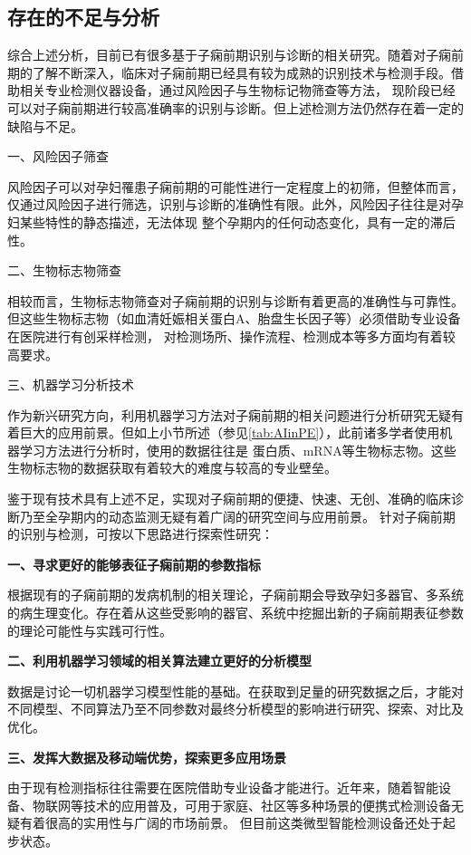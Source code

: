 \subsection{存在的不足与分析}
综合上述分析，目前已有很多基于子痫前期识别与诊断的相关研究。随着对子痫前期的了解不断深入，临床对子痫前期已经具有较为成熟的识别技术与检测手段。借助相关专业检测仪器设备，通过风险因子与生物标记物筛查等方法，
现阶段已经可以对子痫前期进行较高准确率的识别与诊断。但上述检测方法仍然存在着一定的缺陷与不足。

一、风险因子筛查

风险因子可以对孕妇罹患子痫前期的可能性进行一定程度上的初筛，但整体而言，仅通过风险因子进行筛选，识别与诊断的准确性有限。此外，风险因子往往是对孕妇某些特性的静态描述，无法体现
整个孕期内的任何动态变化，具有一定的滞后性。

二、生物标志物筛查

相较而言，生物标志物筛查对子痫前期的识别与诊断有着更高的准确性与可靠性。但这些生物标志物（如血清妊娠相关蛋白A、胎盘生长因子等）必须借助专业设备在医院进行有创采样检测，
对检测场所、操作流程、检测成本等多方面均有着较高要求。

三、机器学习分析技术

作为新兴研究方向，利用机器学习方法对子痫前期的相关问题进行分析研究无疑有着巨大的应用前景。但如上小节所述（参见\autoref{tab:AIinPE}），此前诸多学者使用机器学习方法进行分析时，使用的数据往往是
蛋白质、mRNA等生物标志物。这些生物标志物的数据获取有着较大的难度与较高的专业壁垒。

鉴于现有技术具有上述不足，实现对子痫前期的便捷、快速、无创、准确的临床诊断乃至全孕期内的动态监测无疑有着广阔的研究空间与应用前景。
针对子痫前期的识别与检测，可按以下思路进行探索性研究：

\textbf{一、寻求更好的能够表征子痫前期的参数指标}

根据现有的子痫前期的发病机制的相关理论，子痫前期会导致孕妇多器官、多系统的病生理变化。存在着从这些受影响的器官、系统中挖掘出新的子痫前期表征参数的理论可能性与实践可行性。

\textbf{二、利用机器学习领域的相关算法建立更好的分析模型}

数据是讨论一切机器学习模型性能的基础。在获取到足量的研究数据之后，才能对不同模型、不同算法乃至不同参数对最终分析模型的影响进行研究、探索、对比及优化。

\textbf{三、发挥大数据及移动端优势，探索更多应用场景}

由于现有检测指标往往需要在医院借助专业设备才能进行。近年来，随着智能设备、物联网等技术的应用普及，可用于家庭、社区等多种场景的便携式检测设备无疑有着很高的实用性与广阔的市场前景。
但目前这类微型智能检测设备还处于起步状态。

